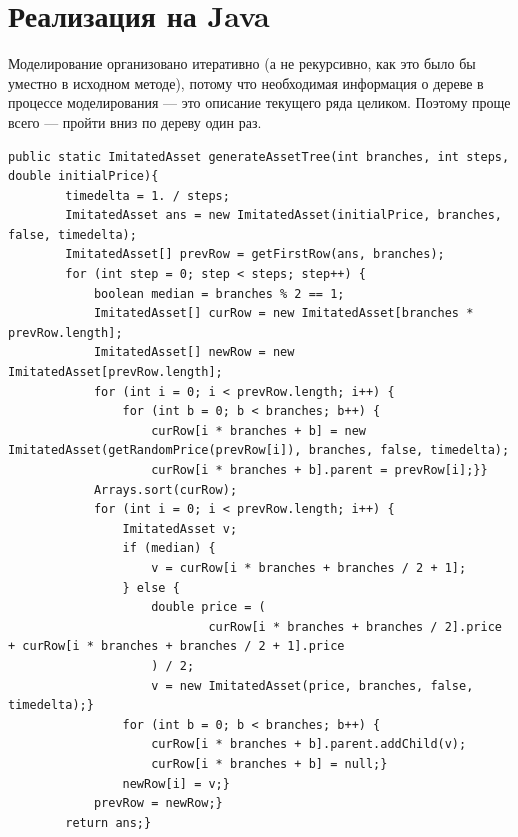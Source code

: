 \documentclass[specialist,
               substylefile = spbu.rtx,
               subf,href,colorlinks=true, 12pt]{disser}
\begin{document}
\appendix
\chapter{Реализация на Java}
Моделирование организовано итеративно (а не рекурсивно, как это было бы уместно в исходном методе), потому что необходимая информация о дереве в процессе моделирования --- это описание текущего ряда целиком. Поэтому проще всего --- пройти вниз по дереву один раз.
\renewcommand{\lstlistingname}{Листинг}%
\renewcommand{\lstlistlistingname}{Листинги}
\begin{lstlisting}[caption={Генерирование дерева состояний актива, на который выписан опцион},label={lst:treeGeneration}]
public static ImitatedAsset generateAssetTree(int branches, int steps, double initialPrice){
        timedelta = 1. / steps;
        ImitatedAsset ans = new ImitatedAsset(initialPrice, branches, false, timedelta);
        ImitatedAsset[] prevRow = getFirstRow(ans, branches);
        for (int step = 0; step < steps; step++) {
            boolean median = branches % 2 == 1;
            ImitatedAsset[] curRow = new ImitatedAsset[branches * prevRow.length];
            ImitatedAsset[] newRow = new ImitatedAsset[prevRow.length];
            for (int i = 0; i < prevRow.length; i++) {
                for (int b = 0; b < branches; b++) {
                    curRow[i * branches + b] = new ImitatedAsset(getRandomPrice(prevRow[i]), branches, false, timedelta);
                    curRow[i * branches + b].parent = prevRow[i];}}
            Arrays.sort(curRow);
            for (int i = 0; i < prevRow.length; i++) {
                ImitatedAsset v;
                if (median) {
                    v = curRow[i * branches + branches / 2 + 1];
                } else {
                    double price = (
                            curRow[i * branches + branches / 2].price + curRow[i * branches + branches / 2 + 1].price
                    ) / 2;
                    v = new ImitatedAsset(price, branches, false, timedelta);}
                for (int b = 0; b < branches; b++) {
                    curRow[i * branches + b].parent.addChild(v);
                    curRow[i * branches + b] = null;}
                newRow[i] = v;}
            prevRow = newRow;}
        return ans;}
	\end{lstlisting}
\end{document}
